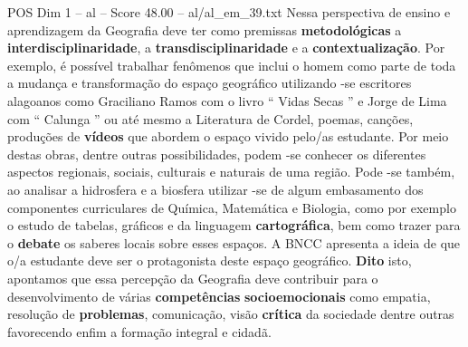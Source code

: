 \begin{textsample}{POS Dim 1 – al – Score 48.00 – al/al\_em\_39.txt}
Nessa perspectiva de ensino e aprendizagem da Geografia deve ter como premissas \textbf{metodológicas} a \textbf{interdisciplinaridade}, a \textbf{transdisciplinaridade} e a \textbf{contextualização}.
Por exemplo, é possível trabalhar fenômenos que inclui o homem como parte de toda a mudança e transformação do espaço geográfico utilizando -se escritores alagoanos como Graciliano Ramos com o livro “ Vidas Secas ” e Jorge de Lima com “ Calunga ” ou até mesmo a Literatura de Cordel, poemas, canções, produções de \textbf{vídeos} que abordem o espaço vivido pelo/as estudante.
Por meio destas obras, dentre outras possibilidades, podem -se conhecer os diferentes aspectos regionais, sociais, culturais e naturais de uma região.
Pode -se também, ao analisar a hidrosfera e a biosfera utilizar -se de algum embasamento dos componentes curriculares de Química, Matemática e Biologia, como por exemplo o estudo de tabelas, gráficos e da linguagem \textbf{cartográfica}, bem como trazer para o \textbf{debate} os saberes locais sobre esses espaços.
A BNCC apresenta a ideia de que o/a estudante deve ser o protagonista deste espaço geográfico. \textbf{Dito} isto, apontamos que essa percepção da Geografia deve contribuir para o desenvolvimento de várias \textbf{competências} \textbf{socioemocionais} como empatia, resolução de \textbf{problemas}, comunicação, visão \textbf{crítica} da sociedade dentre outras favorecendo enfim a formação integral e cidadã.

\end{textsample}

